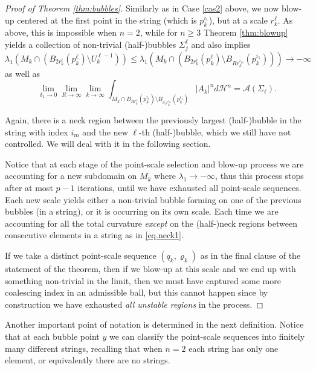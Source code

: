 \documentclass[JEP,XML,SOM,Unicode]{cedram}
\let\mathcal\mathscr
\newcounter{cas}
\theoremstyle{definition}
\newcommand{\h}{\mathscr{H}}
\begin{document}
\begin{proof}[Proof of Theorem \ref{thm:bubbles}]
Similarly as in Case \ref{cas2} above, we now blow-up centered at the first point in the string (which is $p^{i_1}_k$), but at a scale $r^\ell_k$. As above, this is impossible when $n=2$, while for $n\geq 3$ Theorem \ref{thm:blowup} yields a collection of non-trivial (half-)bubbles $\Sigma^\ell_j$ and also implies $$\lambda_1 (M_k\cap (B_{2r^\ell_k}(p^\ell_k)\setminus U^{\ell-1}_k))\leq\lambda_1(M_k\cap(B_{2r^\ell_k}(p^\ell_k)\setminus B_{Rr^{i_m}_k}(p^{i_1}_k)))\to -\infty$$ as well as
\begin{equation}\label{eq.lthbubble2}
\lim_{\delta_1\to 0 }\lim_{R\to \infty}\lim_{k\to \infty} \int_{M_k\cap B_{Rr^\ell_k}(p^{i_1}_k)\setminus B_{\delta_1 r^{i_m}_k}(p^{i_1}_k)} |A_k|^n d \h^n = \mathcal{A}(\Sigma_\ell).
\end{equation}

Again, there is a neck region between the previously largest (half-)bubble in the string with index $i_m$ and the new $\ell$-th (half-)bubble, which we still have not controlled. We will deal with it in the following section.

Notice that at each stage of the point-scale selection and blow-up process we are accounting for a new subdomain on $M_k$ where $\lambda_1 \to -\infty$, thus this process stops after at most $p-1$ iterations, until we have exhausted all point-scale sequences. Each new scale yields either a non-trivial bubble forming on one of the previous bubbles (in a string), or it is occurring on its own scale. Each time we are accounting for all the total curvature \emph{except} on the (half-)neck regions between consecutive elements in a string as in \eqref{eq.neck1}.

If we take a distinct point-scale sequence $(q_k,\varrho_k)$ as in the final clause of the statement of the theorem, then if we blow-up at this scale and we end up with something non-trivial in the limit, then we must have captured some more coalescing index in an admissible ball, but this cannot happen since by construction we have exhausted \emph{all unstable regions} in the process.
\end{proof}

Another important point of notation is determined in the next definition. Notice that at each bubble point $y$ we can classify the point-scale sequences into finitely many different strings, recalling that when $n=2$ each string has only one element, or equivalently there are no strings.
\end{document}

